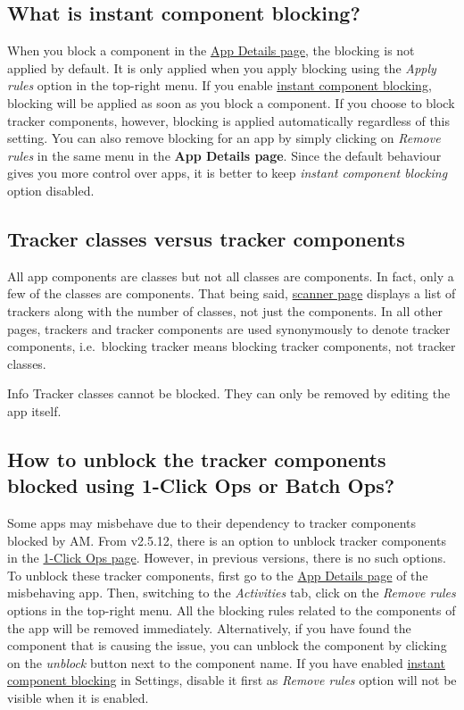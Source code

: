 \subsection{What is instant component blocking?}\label{subsec:faq:what-is-instant-component-blocking}
When you block a component in the \hyperref[sec:app-details-page]{App Details page}, the blocking is not applied by
default. It is only applied when you apply blocking using the \textit{Apply rules} option in the top-right menu. If you
enable \hyperref[subsubsec:instant-component-blocking]{instant component blocking}, blocking will be applied as soon as you block a component. If you choose to
block tracker components, however, blocking is applied automatically regardless of this setting. You can also remove
blocking for an app by simply clicking on \textit{Remove rules} in the same menu in the \textbf{App Details page}. Since
the default behaviour gives you more control over apps, it is better to keep \textit{instant component blocking} option
disabled.

\subsection{Tracker classes versus tracker components}\label{subsec:tracker-classes-versus-tracker-components}
All app components are classes but not all classes are components. In fact, only a few of the classes are components.
That being said, \hyperref[sec:scanner-page]{scanner page} displays a list of trackers along with the number of classes,
not just the components. In all other pages, trackers and tracker components are used synonymously to denote tracker
components, i.e.\ blocking tracker means blocking tracker components, not tracker classes.

\begin{tip}{Info}
    Tracker classes cannot be blocked. They can only be removed by editing the app itself.
\end{tip}

\subsection{How to unblock the tracker components blocked using 1-Click Ops or Batch Ops?}\label{subsec:faq:how-to-unblock-tracker-components}
Some apps may misbehave due to their dependency to tracker components blocked by AM. From v2.5.12, there is an option
to unblock tracker components in the \hyperref[sec:1-click-ops-page]{1-Click Ops page}. However, in previous versions,
there is no such options. To unblock these tracker components, first go to the \hyperref[sec:app-details-page]{App
Details page} of the misbehaving app. Then, switching to the \textit{Activities} tab, click on the \textit{Remove rules}
options in the top-right menu. All the blocking rules related to the components of the app will be removed immediately.
Alternatively, if you have found the component that is causing the issue, you can unblock the component by clicking on
the \textit{unblock} button next to the component name. If you have enabled
\hyperref[subsubsec:instant-component-blocking]{instant component blocking} in Settings, disable it first as
\textit{Remove rules} option will not be visible when it is enabled.

